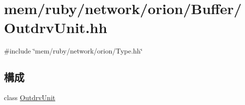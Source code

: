 \hypertarget{OutdrvUnit_8hh}{
\section{mem/ruby/network/orion/Buffer/OutdrvUnit.hh}
\label{OutdrvUnit_8hh}
}
{\ttfamily \#include \char`\"{}mem/ruby/network/orion/Type.hh\char`\"{}}\par
\subsection*{構成}
\begin{DoxyCompactItemize}
\item 
class \hyperlink{classOutdrvUnit}{OutdrvUnit}
\end{DoxyCompactItemize}
